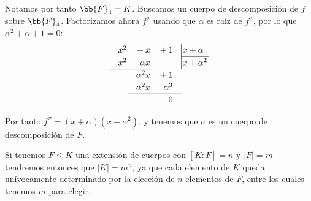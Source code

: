 \begin{ejemplo}
    Notamos por tanto $\bb{F}_4=K$. Buscamos un cuerpo de descomposición de $f$ sobre $\bb{F}_4$. Factorizamos ahora $f^\sigma$ usando que $\alpha$ es raíz de $f^\sigma$, por lo que $\alpha^2 + \alpha + 1 = 0$:
    \[
    \renewcommand{\arraystretch}{1.2}
    \setlength{\arraycolsep}{1.5pt}
    \begin{array}{rrr@{\quad}l}
    x^2 & {}+{} x & {}+{} 1        & \multicolumn{1}{|l}{x + \alpha} \\ \cline{4-4}
    -x^2 & {}-{} \alpha x &       & \multicolumn{1}{|l}{x + \alpha^2} \\ \cline{1-2}
        & \alpha^2 x & {}+{} 1   & \\
        & -\alpha^2 x & {}-{} \alpha^3 & \\ \cline{2-3}
        & & 0                    & 
    \end{array}
    \]

    Por tanto $f^\sigma = (x+\alpha)(x+\alpha^2)$, y
    tenemos que $\sigma$ es un cuerpo de descomposición de $F$.    
\end{ejemplo}

\begin{observacion}
    Si tenemos $F\leq K$ una extensión de cuerpos con $[K:F] = n$ y $|F| = m$ tendremos entonces que $|K| = m^n$, ya que cada elemento de $K$ queda unívocamente determinado por la elección de $n$ elementos de $F$, entre los cuales tenemos $m$ para elegir.
\end{observacion}


